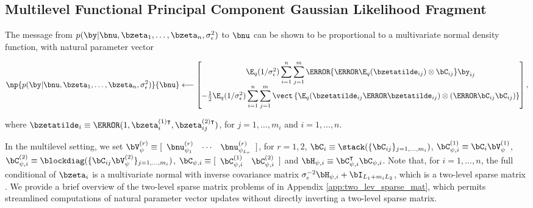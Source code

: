 \documentclass[ba]{imsart}
\numberwithin{equation}{section}
\theoremstyle{plain}
\def\sigsqeps{\sigma^2_{\epsilon}}
\newcommand\Hpsi[1]{\bH_{\psi, #1}}
\newcommand\Cpsi[1]{\bC_{\psi, #1}}
\newcommand\CTpsi[1]{\bC^{\intercal}_{\psi, #1}}
\newcommand\CpsiL[2]{\bC^{(#1)}_{\psi, #2}}
\newcommand\VpsiL[1]{\bV^{(#1)}_{\psi}}
\newcommand\bzetaTL[2]{\bzeta^{(#1) \intercal}_{#2}}
\newcommand\nupsiL[2]{\bnu^{(#1)}_{\psi_{#2}}}
\begin{document}

\subsection{Multilevel Functional Principal Component Gaussian Likelihood Fragment}
\label{sec:mlfpc_gauss_lik_frag}

The message from $p (\by | \bnu, \bzeta_1, \dots, \bzeta_n, \sigsqeps)$ to $\bnu$ can be shown to be
proportional to a multivariate normal density function, with natural parameter vector

\begin{equation}
	\np{p (\by | \bnu, \bzeta_1, \dots, \bzeta_n, \sigsqeps)}{\bnu}
		\longleftarrow
			\begin{bmatrix}
				\E_q (1/\sigsqeps) \displaystyle\sum_{i=1}^n \sum_{j=1}^m \T{\left\{
					\T{\E_q (\bzetatilde_{ij})} \otimes \bC_{ij}
				\right\}} \by_{ij} \\
				-\frac12 \E_q (1/\sigsqeps) \displaystyle\sum_{i=1}^n \sum_{j=1}^m \vect \left\{
					\E_q (\bzetatilde_{ij} \T{\bzetatilde_{ij}}) \otimes (\T{\bC_{ij}} \bC_{ij})
				\right\}
			\end{bmatrix},
\label{np_ml_lik_nu}
\end{equation}

\noindent where $\bzetatilde_i \equiv \T{(1, \bzetaTL{1}{i}, \bzetaTL{2}{ij})}$, for $j = 1, \dots, m_i$ and
$i = 1, \dots, n$.

In the multilevel setting, we set
$\VpsiL{r} \equiv [ \begin{array}{ccc} \nupsiL{r}{1} & \cdots & \nupsiL{r}{L_r} \end{array}]$, for $r = 1, 2$,
 $\bC_i \equiv \stack (\{ \bC_{ij} \}_{j = 1, \dots, m_i})$,
$\CpsiL{1}{i} \equiv \bC_i \VpsiL{1}$, $\CpsiL{2}{i} \equiv \blockdiag ( \{ \bC_{ij} \VpsiL{2}
\}_{j = 1, \dots, m_i} )$, $\Cpsi{i} \equiv [ \begin{array}{cc} \CpsiL{1}{i} & \CpsiL{2}{i} \end{array} ]$
and $\Hpsi{i} \equiv \CTpsi{i} \Cpsi{i}$. Note that, for $i = 1, \dots, n$,
the full conditional of $\bzeta_i$ is a multivariate normal
with inverse covariance matrix $\sigma_\epsilon^{-2} \Hpsi{i} + \bI_{L_1 + m_i L_2}$, which is a two-level
sparse matrix \cite[Definition~1]{nolan20}. We provide a brief overview of the two-level sparse matrix problems
of \cite{nolan20}
in Appendix \ref{app:two_lev_sparse_mat}, which permits streamlined computations of natural parameter
vector updates without directly inverting a two-level sparse matrix.
\end{document}
